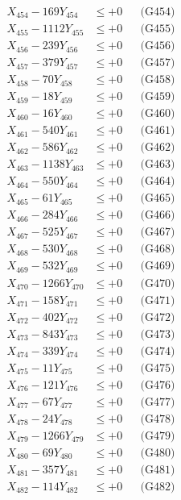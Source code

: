 \documentclass[a4paper,10pt]{article}
\begin{document}
{\begin{align}
X_{454} - 169Y_{454} &\leq +0 && \text{(G454)} \\
X_{455} - 1112Y_{455} &\leq +0 && \text{(G455)} \\
X_{456} - 239Y_{456} &\leq +0 && \text{(G456)} \\
X_{457} - 379Y_{457} &\leq +0 && \text{(G457)} \\
X_{458} - 70Y_{458} &\leq +0 && \text{(G458)} \\
X_{459} - 18Y_{459} &\leq +0 && \text{(G459)} \\
X_{460} - 16Y_{460} &\leq +0 && \text{(G460)} \\
\allowbreak
X_{461} - 540Y_{461} &\leq +0 && \text{(G461)} \\
X_{462} - 586Y_{462} &\leq +0 && \text{(G462)} \\
X_{463} - 1138Y_{463} &\leq +0 && \text{(G463)} \\
X_{464} - 550Y_{464} &\leq +0 && \text{(G464)} \\
X_{465} - 61Y_{465} &\leq +0 && \text{(G465)} \\
X_{466} - 284Y_{466} &\leq +0 && \text{(G466)} \\
X_{467} - 525Y_{467} &\leq +0 && \text{(G467)} \\
X_{468} - 530Y_{468} &\leq +0 && \text{(G468)} \\
X_{469} - 532Y_{469} &\leq +0 && \text{(G469)} \\
X_{470} - 1266Y_{470} &\leq +0 && \text{(G470)} \\
\allowbreak
X_{471} - 158Y_{471} &\leq +0 && \text{(G471)} \\
X_{472} - 402Y_{472} &\leq +0 && \text{(G472)} \\
X_{473} - 843Y_{473} &\leq +0 && \text{(G473)} \\
X_{474} - 339Y_{474} &\leq +0 && \text{(G474)} \\
X_{475} - 11Y_{475} &\leq +0 && \text{(G475)} \\
X_{476} - 121Y_{476} &\leq +0 && \text{(G476)} \\
X_{477} - 67Y_{477} &\leq +0 && \text{(G477)} \\
X_{478} - 24Y_{478} &\leq +0 && \text{(G478)} \\
X_{479} - 1266Y_{479} &\leq +0 && \text{(G479)} \\
X_{480} - 69Y_{480} &\leq +0 && \text{(G480)} \\
\allowbreak
X_{481} - 357Y_{481} &\leq +0 && \text{(G481)} \\
X_{482} - 114Y_{482} &\leq +0 && \text{(G482)} \\

\end{align}}
\end{document}
